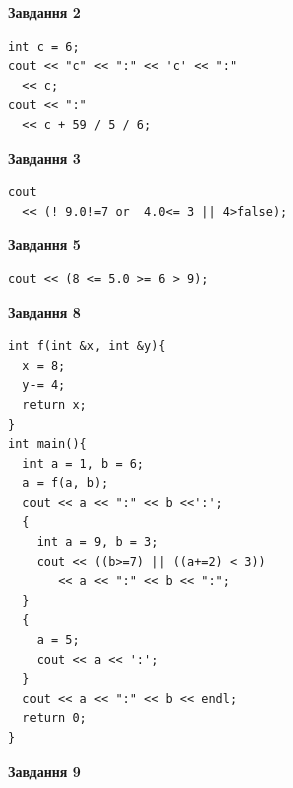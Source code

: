 \documentclass[12pt, ukrainian]{article}
\begin{document}
{\begin {large}
\begin{minipage}[t]{7.0cm}
\end{minipage}
\vline \hspace{1mm}
\begin{minipage}[t]{11.0cm}

\begin{center}
\textbf{Завдання 2}
\end{center}
\vspace{-8mm}

\begin{verbatim}
int c = 6;
cout << "c" << ":" << 'c' << ":" 
  << c;
cout << ":" 
  << c + 59 / 5 / 6;
\end{verbatim}



\begin{center}
\textbf{Завдання 3}
\end{center}
\vspace{-8mm}

\begin{verbatim}
cout 
  << (! 9.0!=7 or  4.0<= 3 || 4>false);
\end{verbatim}



\begin{center}
\textbf{Завдання 5}
\end{center}
\vspace{-8mm}

\begin{verbatim}
cout << (8 <= 5.0 >= 6 > 9);
\end{verbatim}



\begin{center}
\textbf{Завдання 8}
\end{center}
\vspace{-8mm}

\begin{verbatim}
int f(int &x, int &y){
  x = 8;
  y-= 4;
  return x;
}
int main(){
  int a = 1, b = 6;
  a = f(a, b);
  cout << a << ":" << b <<':';
  {
    int a = 9, b = 3;
    cout << ((b>=7) || ((a+=2) < 3))
       << a << ":" << b << ":";
  }
  {
    a = 5;
    cout << a << ':';
  }
  cout << a << ":" << b << endl;
  return 0;
}
\end{verbatim}

\end{minipage}


\begin{minipage}[t]{7.0cm}

\begin{center}
\textbf{Завдання 9}
\end{center}
\vspace{-8mm}


\end{minipage}
\end{large}}
\end{document}
